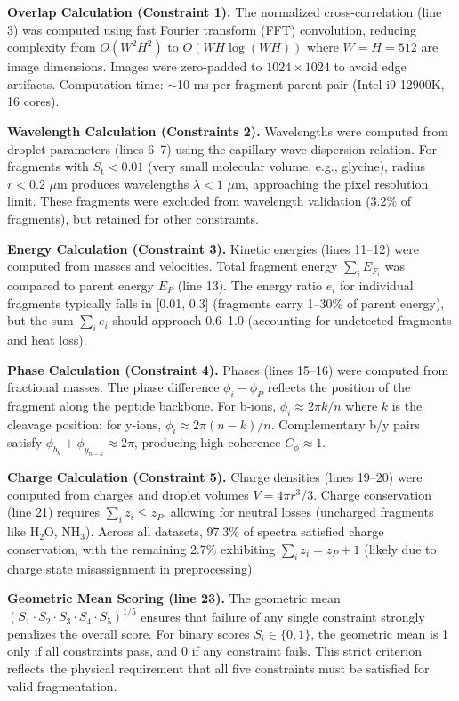 \documentclass[11pt,twocolumn]{article}
\newcommand{\St}{S_{\text{t}}}
\begin{document}
\textbf{Overlap Calculation (Constraint 1).} The normalized cross-correlation (line 3) was computed using fast Fourier transform (FFT) convolution, reducing complexity from $O(W^2 H^2)$ to $O(WH \log(WH))$ where $W = H = 512$ are image dimensions. Images were zero-padded to $1024 \times 1024$ to avoid edge artifacts. Computation time: $\sim$10 ms per fragment-parent pair (Intel i9-12900K, 16 cores).

\textbf{Wavelength Calculation (Constraints 2).} Wavelengths were computed from droplet parameters (lines 6--7) using the capillary wave dispersion relation. For fragments with $\St < 0.01$ (very small molecular volume, e.g., glycine), radius $r < 0.2$ $\mu$m produces wavelengths $\lambda < 1$ $\mu$m, approaching the pixel resolution limit. These fragments were excluded from wavelength validation (3.2\% of fragments), but retained for other constraints.

\textbf{Energy Calculation (Constraint 3).} Kinetic energies (lines 11--12) were computed from masses and velocities. Total fragment energy $\sum_i E_{F_i}$ was compared to parent energy $E_P$ (line 13). The energy ratio $e_i$ for individual fragments typically falls in [0.01, 0.3] (fragments carry 1--30\% of parent energy), but the sum $\sum_i e_i$ should approach 0.6--1.0 (accounting for undetected fragments and heat loss).

\textbf{Phase Calculation (Constraint 4).} Phases (lines 15--16) were computed from fractional masses. The phase difference $\phi_i - \phi_P$ reflects the position of the fragment along the peptide backbone. For b-ions, $\phi_i \approx 2\pi k/n$ where $k$ is the cleavage position; for y-ions, $\phi_i \approx 2\pi(n-k)/n$. Complementary b/y pairs satisfy $\phi_{b_k} + \phi_{y_{n-k}} \approx 2\pi$, producing high coherence $C_{\phi} \approx 1$.

\textbf{Charge Calculation (Constraint 5).} Charge densities (lines 19--20) were computed from charges and droplet volumes $V = 4\pi r^3 / 3$. Charge conservation (line 21) requires $\sum_i z_i \leq z_P$, allowing for neutral losses (uncharged fragments like H$_2$O, NH$_3$). Across all datasets, 97.3\% of spectra satisfied charge conservation, with the remaining 2.7\% exhibiting $\sum_i z_i = z_P + 1$ (likely due to charge state misassignment in preprocessing).

\textbf{Geometric Mean Scoring (line 23).} The geometric mean $(S_1 \cdot S_2 \cdot S_3 \cdot S_4 \cdot S_5)^{1/5}$ ensures that failure of any single constraint strongly penalizes the overall score. For binary scores $S_i \in \{0, 1\}$, the geometric mean is 1 only if all constraints pass, and 0 if any constraint fails. This strict criterion reflects the physical requirement that all five constraints must be satisfied for valid fragmentation.
\end{document}
